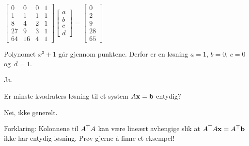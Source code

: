 \begin{losning}

\begin{punkt}
$
\begin{bmatrix}
0 & 0 & 0 & 1\\
1 & 1 & 1 & 1\\
8 & 4 & 2 & 1\\
27 & 9 & 3 & 1\\
64 & 16 & 4 & 1
\end{bmatrix}\begin{bmatrix}
a\\
b\\
c\\
d
\end{bmatrix}=\begin{bmatrix}
0\\
2\\
9\\
28\\
65
\end{bmatrix}$
\end{punkt}

\begin{punkt}
Polynomet $x^3+1$ går gjennom punktene. Derfor er en løsning $a=1$, $b=0$, $c=0$ og~$d=1$.
\end{punkt}

\begin{punkt}
Ja.
\end{punkt}

\end{losning}

\begin{oppgave}
Er minste kvadraters løsning til et system $A\mathbf{x}=\mathbf{b}$ entydig?
\end{oppgave}

\begin{losning}
Nei, ikke generelt.

\noindent
Forklaring: Kolonnene til $A^\top A$ kan være lineært avhengige slik at $A^\top A \mathbf{x}=A^\top \mathbf{b}$ ikke har entydig løsning. Prøv gjerne å finne et eksempel!
\end{losning}



